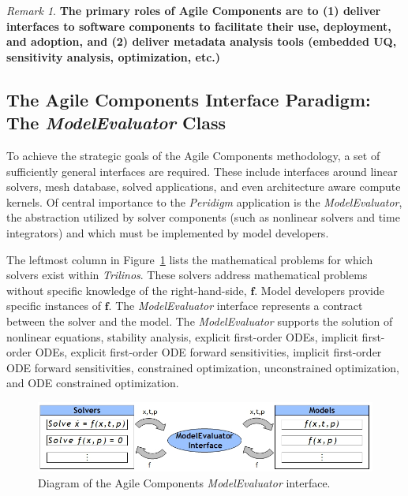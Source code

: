 \documentclass[pdf,ps2pdf,12pt,report]{SANDreport}
\theoremstyle{plain}
\theoremstyle{definition}
\theoremstyle{remark}
\newtheorem{rem}{Remark}[section]
\numberwithin{equation}{section}
\begin{document}
\begin{rem}
\textbf{The primary roles of Agile Components are to (1) deliver interfaces to software components to facilitate their use, deployment, and adoption, and (2) deliver metadata analysis tools (embedded UQ, sensitivity analysis, optimization, etc.)}
\end{rem}

\subsection{The Agile Components Interface Paradigm: The \emph{ModelEvaluator} Class}

To achieve the strategic goals of the Agile Components methodology, a set of sufficiently general interfaces are required. These include interfaces around linear solvers, mesh database, solved applications, and even architecture aware compute kernels. Of central importance to the \emph{Peridigm} application is the \emph{ModelEvaluator}, the abstraction utilized by solver components (such as nonlinear solvers and time integrators) and which must be implemented by model developers.

The leftmost column in Figure~\ref{fig:ACModelEvaluator} lists the mathematical problems for which solvers exist within \emph{Trilinos}. These solvers address mathematical problems without specific knowledge of the right-hand-side, $\mathbf{f}$. Model developers provide specific instances of $\mathbf{f}$. The \emph{ModelEvaluator} interface represents a contract between the solver and the model. The \emph{ModelEvaluator} supports the solution of nonlinear equations, stability analysis, explicit first-order ODEs, implicit first-order ODEs, explicit first-order ODE forward sensitivities, implicit first-order ODE forward sensitivities, constrained optimization, unconstrained optimization, and ODE constrained optimization.

\begin{figure}[h!]
\begin{center}
	\includegraphics[width=\linewidth]{ModelEvaluatorInterface}
 \end{center}
 \caption{Diagram of the Agile Components \emph{ModelEvaluator} interface.}
\label{fig:ACModelEvaluator}
\end{figure}
\end{document}
